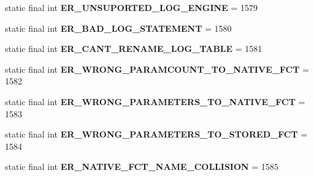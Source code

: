 \begin{DoxyCompactItemize}
static final int {\bfseries E\+R\+\_\+\+U\+N\+S\+U\+P\+O\+R\+T\+E\+D\+\_\+\+L\+O\+G\+\_\+\+E\+N\+G\+I\+NE} = 1579
\item 
\mbox{\label{classcom_1_1mysql_1_1jdbc_1_1_mysql_error_numbers_aef21cbbe009923730c17efd7e810781f}} 
static final int {\bfseries E\+R\+\_\+\+B\+A\+D\+\_\+\+L\+O\+G\+\_\+\+S\+T\+A\+T\+E\+M\+E\+NT} = 1580
\item 
\mbox{\label{classcom_1_1mysql_1_1jdbc_1_1_mysql_error_numbers_a0e43078f00a0308977339f450e61c7ba}} 
static final int {\bfseries E\+R\+\_\+\+C\+A\+N\+T\+\_\+\+R\+E\+N\+A\+M\+E\+\_\+\+L\+O\+G\+\_\+\+T\+A\+B\+LE} = 1581
\item 
\mbox{\label{classcom_1_1mysql_1_1jdbc_1_1_mysql_error_numbers_ad3cb2557659551b296f30a6e3395a467}} 
static final int {\bfseries E\+R\+\_\+\+W\+R\+O\+N\+G\+\_\+\+P\+A\+R\+A\+M\+C\+O\+U\+N\+T\+\_\+\+T\+O\+\_\+\+N\+A\+T\+I\+V\+E\+\_\+\+F\+CT} = 1582
\item 
\mbox{\label{classcom_1_1mysql_1_1jdbc_1_1_mysql_error_numbers_a6cadc6d3c7a458ebd2464daf74ddf380}} 
static final int {\bfseries E\+R\+\_\+\+W\+R\+O\+N\+G\+\_\+\+P\+A\+R\+A\+M\+E\+T\+E\+R\+S\+\_\+\+T\+O\+\_\+\+N\+A\+T\+I\+V\+E\+\_\+\+F\+CT} = 1583
\item 
\mbox{\label{classcom_1_1mysql_1_1jdbc_1_1_mysql_error_numbers_a3cd258e11bb99a0faa8c92a2744539c8}} 
static final int {\bfseries E\+R\+\_\+\+W\+R\+O\+N\+G\+\_\+\+P\+A\+R\+A\+M\+E\+T\+E\+R\+S\+\_\+\+T\+O\+\_\+\+S\+T\+O\+R\+E\+D\+\_\+\+F\+CT} = 1584
\item 
\mbox{\label{classcom_1_1mysql_1_1jdbc_1_1_mysql_error_numbers_a75e0dbb87f447f50841ed03cbbfa7aa4}} 
static final int {\bfseries E\+R\+\_\+\+N\+A\+T\+I\+V\+E\+\_\+\+F\+C\+T\+\_\+\+N\+A\+M\+E\+\_\+\+C\+O\+L\+L\+I\+S\+I\+ON} = 1585
\item 
\mbox{\label{classcom_1_1mysql_1_1jdbc_1_1_mysql_error_numbers_a3ba1a22257c98d3c89624495cb596558}} 

\end{DoxyCompactItemize}
